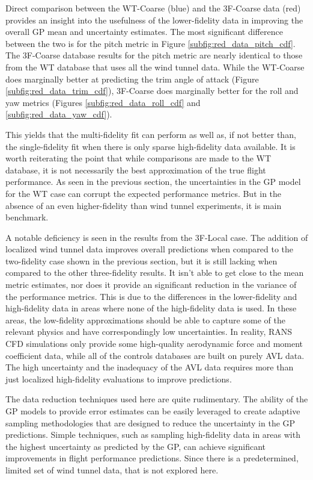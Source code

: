 Direct comparison between the WT-Coarse (blue) and the 3F-Coarse data (red) provides an insight into the usefulness of the lower-fidelity data in improving the overall GP mean and uncertainty estimates. 
The most significant difference between the two is for the pitch metric in Figure \ref{subfig:red_data_pitch_cdf}.
The 3F-Coarse database results for the pitch metric are nearly identical to those from the WT database that uses all the wind tunnel data. 
While the WT-Coarse does marginally better at predicting the trim angle of attack (Figure \ref{subfig:red_data_trim_cdf}), 3F-Coarse does marginally better for the roll and yaw metrics (Figures \ref{subfig:red_data_roll_cdf} and \ref{subfig:red_data_yaw_cdf}).

This yields that the multi-fidelity fit can perform as well as, if not better than, the single-fidelity fit when there is only sparse high-fidelity data available. 
It is worth reiterating the point that while comparisons are made to the WT database, it is not necessarily the best approximation of the true flight performance.
As seen in the previous section, the uncertainties in the GP model for the WT case can corrupt the expected performance metrics. 
But in the absence of an even higher-fidelity than wind tunnel experiments, it is main benchmark. 

A notable deficiency is seen in the results from the 3F-Local case. 
The addition of localized wind tunnel data improves overall predictions when compared to the two-fidelity case shown in the previous section, but it is still lacking when compared to the other three-fidelity results. 
It isn't able to get close to the mean metric estimates, nor does it provide an significant reduction in the variance of the performance metrics. 
This is due to the differences in the lower-fidelity and high-fidelity data in areas where none of the high-fidelity data is used. 
In these areas, the low-fidelity approximations should be able to capture some of the relevant physics and have correspondingly low uncertainties. 
In reality, RANS CFD simulations only provide some high-quality aerodynamic force and moment coefficient data, while all of the controls databases are built on purely AVL data. 
The high uncertainty and the inadequacy of the AVL data requires more than just localized high-fidelity evaluations to improve predictions. 

The data reduction techniques used here are quite rudimentary. 
The ability of the GP models to provide error estimates can be easily leveraged to create adaptive sampling methodologies that are designed to reduce the uncertainty in the GP predictions.
Simple techniques, such as sampling high-fidelity data in areas with the highest uncertainty as predicted by the GP, can achieve significant improvements in flight performance predictions. 
Since there is a predetermined, limited set of wind tunnel data, that is not explored here. 